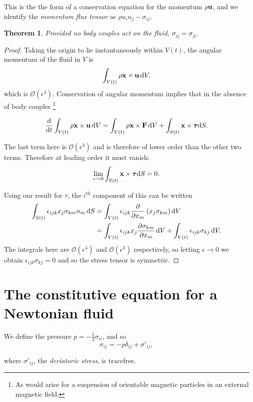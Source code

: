 \documentclass{notes}
\newcommand{\cO}{\mathcal{O}}
\newcommand{\bt}{\boldsymbol{\tau}}
\theoremstyle{plain}
\newtheorem*{theorem}{Theorem}
\begin{document}
This is the the form of a conservation equation for the momentum
$\rho \mathbf{u}$, and we identify the \emph{momentum flux tensor}
as $\rho u_i u_j - \sigma_{i j}$.

\begin{theorem}
Provided no body couples act on the fluid, $\sigma_{i j} = \sigma_{j i}$.
\end{theorem}

\begin{proof}
Taking the origin to lie instantaneously within $V(t)$, the
angular momentum of the fluid in $V$ is
\[
\int_{V(t)} \rho \mathbf{x} \times \mathbf{u}\, \mathrm{d} V,
\]
which is $\cO(\epsilon^4)$.  Conservation of angular momentum
implies that in the absence of body couples%
\footnote{As would arise for a suspension of orientable magnetic
particles in an external magnetic field.}

\[
\diff{}{t} \int_{V(t)} \rho \vx \times \vu\, \ud V
= \int_{V(t)} \rho \vx \times \vF\, \ud V + \int_{S(t)} \vx \times
\bt \ud S.
\]

The last term here is $\cO(\epsilon^3)$ and is therefore of lower order
than the other two terms.  Therefore at leading order it must vanish:
\[
\lim_{\epsilon \to 0} \int_{S(t)} \vx \times \bt \ud S = 0.
\]

Using our result for $\tau$, the $i^{\text{th}}$ component of this
can be written
\begin{align*}
\int_{S(t)} \epsilon_{i j k} x_j \sigma_{k m} n_m\, \mathrm{d} S
&= \int_{V(t)} \epsilon_{i j k} \frac{\partial }{\partial x_m}\left(x_j \sigma_{k m}\right)
\mathrm{d} V \\
&= \int_{V(t)} \epsilon_{i j k} x_j \frac{\partial \sigma_{k m}}{\partial x_m}\, \mathrm{d} V +
\int_{V(t)} \epsilon_{i j k} \sigma_{k j}\, \mathrm{d} V.
\end{align*}
The integrals here are $\cO(\epsilon^4)$ and $\cO(\epsilon^3)$ respectively,
so letting $\epsilon \to 0$ we obtain $\epsilon_{i j k} \sigma_{k j} = 0$
and so the stress tensor is symmetric.
\end{proof}

\section[The constitutive equation]%
{The constitutive equation for a Newtonian fluid}

We define the pressure $p = -\tfrac{1}{3} \sigma_{i i}$, and so
\[
\sigma_{i j} = - p \delta_{i j} + \sigma'_{i j},
\]

where $\sigma'_{i j}$, the \emph{deviatoric stress}, is tracefree.
\end{document}

